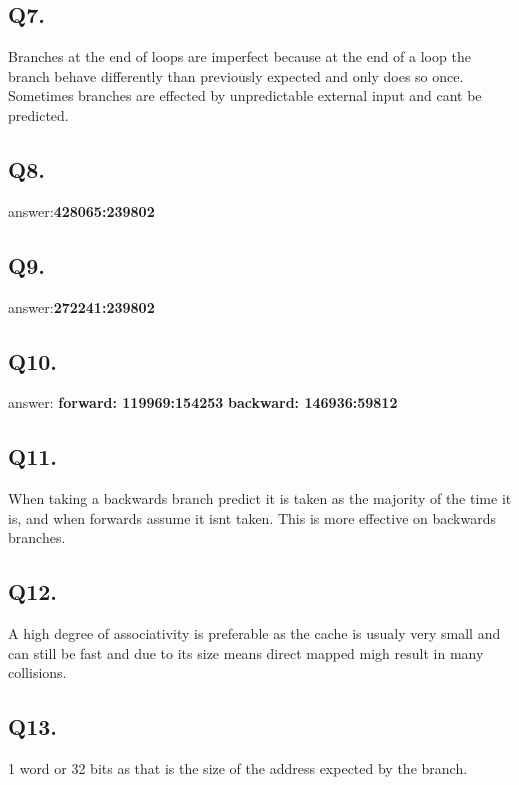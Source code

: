 \documentclass[a4]{article}
\begin{document}
\subsection*{Q7.}
Branches at the end of loops are imperfect because at the end of a loop the branch behave differently than previously expected and only does so once. Sometimes branches 
are effected by unpredictable external input and cant be predicted.

\subsection*{Q8.}
answer:\textbf{428065:239802}\newline

\subsection*{Q9.}
answer:\textbf{272241:239802}\newline

\subsection*{Q10.}
answer:\newline
\textbf{forward: 119969:154253}\newline
\textbf{backward: 146936:59812}\newline

\subsection*{Q11.}
When taking a backwards branch predict it is taken as the majority of the time it is, and when forwards assume it isnt taken. This is more effective on backwards branches.

\subsection*{Q12.}
A high degree of associativity is preferable as the cache is usualy very small and can still be fast and due to its size means direct mapped migh result in many collisions.

\subsection*{Q13.}
1 word or 32 bits as that is the size of the address expected by the branch.
\end{document}
